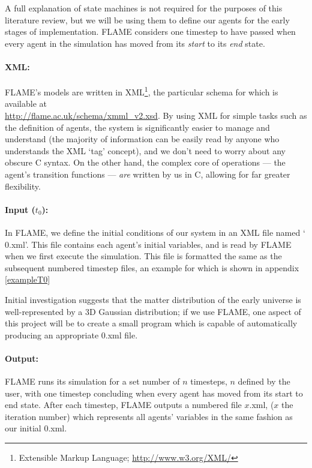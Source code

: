 \documentclass[11pt,a4paper]{article}
\begin{document}
A full explanation of state machines is not required for the purposes of this literature review, but we will be using them to define our agents for the early stages of implementation. FLAME considers one timestep to have passed when every agent in the simulation has moved from its \emph{start} to its \emph{end} state.

\paragraph{XML:}
FLAME's models are written in XML\footnote{Extensible Markup Language; \url{http://www.w3.org/XML/}}, the particular schema for which is available at \\\url{http://flame.ac.uk/schema/xmml_v2.xsd}. By using XML for simple tasks such as the definition of agents, the system is significantly easier to manage and understand (the majority of information can be easily read by anyone who understands the XML `tag' concept), and we don't need to worry about any obscure C syntax. On the other hand, the complex core of operations --- the agent's transition functions --- \emph{are} written by us in C, allowing for far greater flexibility.

\paragraph{Input ($t_{0}$):}
\label{flamet0}
In FLAME, we define the initial conditions of our system in an XML file named `$0$.xml'. This file contains each agent's initial variables, and is read by FLAME when we first execute the simulation. This file is formatted the same as the subsequent numbered timestep files, an example for which is shown in appendix \ref{exampleT0}

Initial investigation suggests that the matter distribution of the early universe is well-represented by a 3D Gaussian distribution; if we use FLAME, one aspect of this project will be to create a small program which is capable of automatically producing an appropriate $0$.xml file.

\paragraph{Output:}
FLAME runs its simulation for a set number of $n$ timesteps, $n$ defined by the user, with one timestep concluding when every agent has moved from its start to end state. After each timestep, FLAME outputs a numbered file $x$.xml, ($x$ the iteration number) which represents all agents' variables in the same fashion as our initial $0$.xml.
\end{document}

